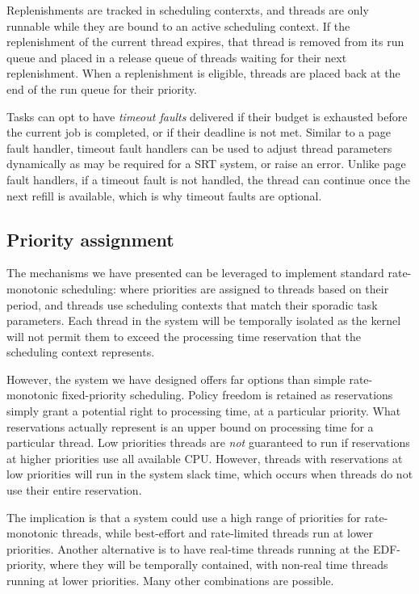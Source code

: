 Replenishments are tracked in scheduling conterxts, and threads are only runnable while they are bound to an active scheduling context.
If the replenishment of the current thread expires, that thread is removed from its run queue and placed in a release queue of threads waiting for their next replenishment.
When a replenishment is eligible, threads are placed back at the end of the run queue for their priority.

Tasks can opt to have \emph{timeout faults} delivered if their budget is exhausted before the current job is completed, or if their deadline is not met.
Similar to a page fault handler, timeout fault handlers can be used to adjust thread parameters dynamically as may be required for a \gls{SRT} system, or raise an error.
Unlike page fault handlers, if a timeout fault is not handled, the thread can continue once the next refill is available, which is why timeout faults are optional.

\subsection{Priority assignment}

The mechanisms we have presented can be leveraged to implement standard rate-monotonic scheduling: where priorities are assigned to threads based on their period, and threads use scheduling contexts that match their sporadic task parameters.
Each thread in the system will be temporally isolated as the kernel will not permit them to exceed the processing time reservation that the scheduling context represents.

However, the system we have designed offers far options than simple rate-monotonic fixed-priority scheduling.
Policy freedom is retained as reservations simply grant a potential right to processing time, at a particular priority.
What reservations actually represent is an upper bound on processing time for a particular thread.
Low priorities threads are \emph{not} guaranteed to run if reservations at higher priorities use all available CPU.
However, threads with reservations at low priorities will run in the system slack time, which occurs when threads do not use their entire reservation.

The implication is that a system could use a high range of priorities for rate-monotonic threads, while best-effort and rate-limited threads run at lower priorities.
Another alternative is to have real-time threads running at the EDF-priority, where they will be temporally contained, with non-real time threads running at lower priorities.
Many other combinations are possible.

